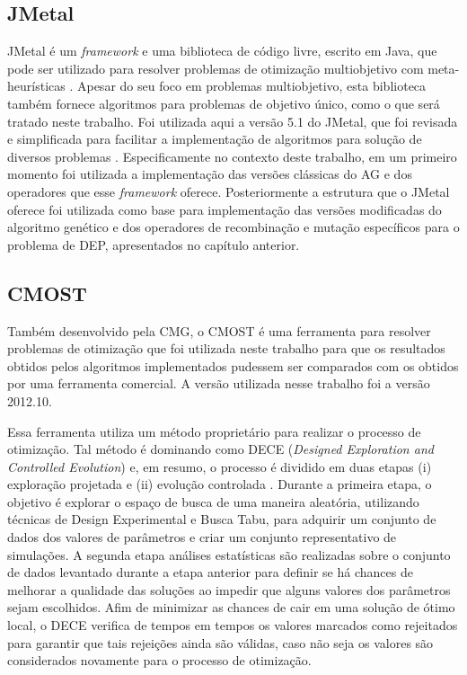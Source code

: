 \subsection{JMetal}

JMetal é um \textit{framework} e uma biblioteca de código livre, escrito em Java, que pode ser utilizado para resolver problemas de otimização multiobjetivo com meta-heurísticas \cite{Durillo2011}. Apesar do seu foco em problemas multiobjetivo, esta biblioteca também fornece algoritmos para problemas de objetivo único, como o que será tratado neste trabalho. Foi utilizada aqui a versão 5.1 do JMetal, que foi revisada e simplificada para facilitar a implementação de algoritmos para solução de diversos problemas \cite{Nebro2015}. Especificamente no contexto deste trabalho, em um primeiro momento foi utilizada a implementação das versões clássicas do AG e dos operadores que esse \textit{framework} oferece. Posteriormente a estrutura que o JMetal oferece foi utilizada como base para implementação das versões modificadas do algoritmo genético e dos operadores de recombinação e mutação específicos para o problema de DEP, apresentados no capítulo anterior. 

\subsection{CMOST}

Também desenvolvido pela CMG, o CMOST é uma ferramenta para resolver problemas de otimização que foi utilizada neste trabalho para que os resultados obtidos pelos algoritmos implementados pudessem ser comparados com os obtidos por uma ferramenta comercial. A versão utilizada nesse trabalho foi a versão 2012.10.

Essa ferramenta utiliza um método proprietário para realizar o processo de otimização. Tal método é dominando como DECE (\textit{Designed Exploration and Controlled Evolution}) e, em resumo, o processo é dividido em duas etapas (i) exploração projetada e (ii) evolução controlada \cite{CMG2012}. Durante a primeira etapa, o objetivo é explorar o espaço de busca de uma maneira aleatória, utilizando técnicas de Design Experimental e Busca Tabu, para adquirir um conjunto de dados dos valores de parâmetros e criar um conjunto representativo de simulações. A segunda etapa análises estatísticas são realizadas sobre o conjunto de dados levantado durante a etapa anterior para definir se há chances de melhorar a qualidade das soluções ao impedir que alguns valores dos parâmetros sejam escolhidos. Afim de minimizar as chances de cair em uma solução de ótimo local, o DECE verifica de tempos em tempos os valores marcados como rejeitados para garantir que tais rejeições ainda são válidas, caso não seja os valores são considerados novamente para o processo de otimização.

